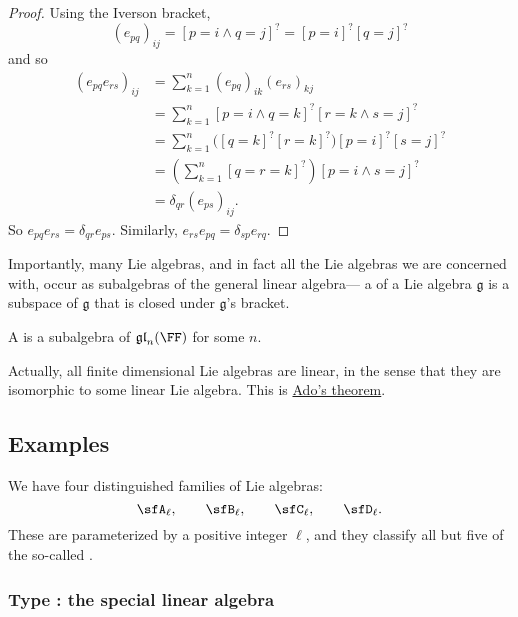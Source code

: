 \documentclass{article}
\newcommand{\iverson}[1]{\ensuremath{\left[{#1}\right]^?}}
\newcommand*\frkg{{\ensuremath{\mathfrak{g}}}}
\newcommand*\gl{\ensuremath{\mathfrak{gl}}}
\begin{document}
\begin{proof}
    Using the Iverson bracket,
    \[
        (e_{pq})_{ij}
        =
        \iverson{p=i \wedge q=j}
        =
        \iverson{p=i}\iverson{q=j}
    \]
    and so
    \begin{align*}
        (e_{pq}e_{rs})_{ij}
        &=
        \sum_{k=1}^n
        (e_{pq})_{ik}
        (e_{rs})_{kj}
        \\
        &=
        \sum_{k=1}^n
        \iverson{p=i \wedge q=k}
        \iverson{r=k \wedge s=j}
        \\
        &=
        \sum_{k=1}^n
        \Big(
            \iverson{q=k}\iverson{r=k}
        \Big)
        \iverson{p=i}
        \iverson{s=j}
        \\
        &=
        \left(
            \sum_{k=1}^n
            \iverson{q=r=k}
        \right)
        \iverson{p=i \wedge s=j}
        \\
        &=
        \delta_{qr}
        (e_{ps})_{ij}.
    \end{align*}
    So $e_{pq}e_{rs} = \delta_{qr}e_{ps}$. 
    Similarly,
    $e_{rs}e_{pq} = \delta_{sp}e_{rq}$.
\end{proof}

Importantly, many Lie algebras, and in fact all the Lie algebras we are concerned with, occur as subalgebras of the general linear algebra--- a  of a Lie algebra $\frkg$ is a subspace of $\frkg$ that is closed under $\frkg$'s bracket.

\begin{definition}
    A  is a subalgebra of $\gl_n(\FF)$ for some $n$.
\end{definition}

Actually, all finite dimensional Lie algebras are linear, in the sense that they are isomorphic to some linear Lie algebra.
This is \href{https://en.wikipedia.org/wiki/Ado%27s_theorem}{Ado's theorem}.

\subsection{Examples}

We have four distinguished families of Lie algebras:
\[
    \sfA_\ell,\qquad
    \sfB_\ell,\qquad
    \sfC_\ell,\qquad
    \sfD_\ell.
\]
These are parameterized by a positive integer $\ell$, and they classify all but five of the so-called .

\subsubsection{Type \sfA: the special linear algebra}
\end{document}
